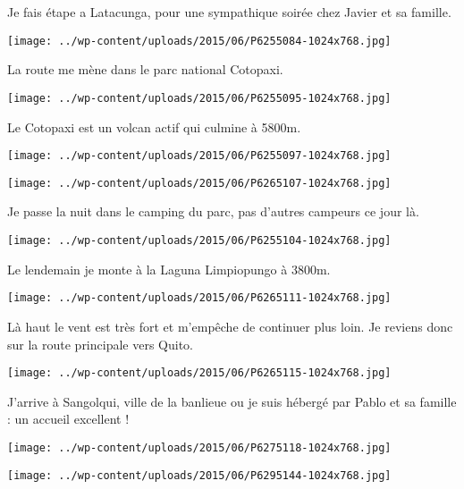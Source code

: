 Je fais étape a Latacunga, pour une sympathique soirée chez Javier et sa famille. 
\begin{center} 
\texttt{[image: ../wp-content/uploads/2015/06/P6255084-1024x768.jpg]} 
\end{center}

La route me mène dans le parc national Cotopaxi. 
\begin{center} 
\texttt{[image: ../wp-content/uploads/2015/06/P6255095-1024x768.jpg]} 
\end{center}
\pagebreak

Le Cotopaxi est un volcan actif qui culmine à 5800m. 
\begin{center} 
\texttt{[image: ../wp-content/uploads/2015/06/P6255097-1024x768.jpg]} 
\end{center}
\begin{center} 
\texttt{[image: ../wp-content/uploads/2015/06/P6265107-1024x768.jpg]} 
\end{center}
\pagebreak

Je passe la nuit dans le camping du parc, pas d'autres campeurs ce jour là. 
\begin{center} 
\texttt{[image: ../wp-content/uploads/2015/06/P6255104-1024x768.jpg]} 
\end{center}

Le lendemain je monte à la Laguna Limpiopungo à 3800m. 
\begin{center} 
\texttt{[image: ../wp-content/uploads/2015/06/P6265111-1024x768.jpg]} 
\end{center}
\pagebreak

Là haut le vent est très fort et m'empêche de continuer plus loin. Je reviens donc sur la route principale vers Quito. 
\begin{center}
\texttt{[image: ../wp-content/uploads/2015/06/P6265115-1024x768.jpg]} 
\end{center}

J'arrive à Sangolqui, ville de la banlieue ou je suis hébergé par Pablo et sa famille : un accueil excellent ! 
\begin{center} 
\texttt{[image: ../wp-content/uploads/2015/06/P6275118-1024x768.jpg]} 
\end{center}
\begin{center}
\texttt{[image: ../wp-content/uploads/2015/06/P6295144-1024x768.jpg]} 
\end{center}

